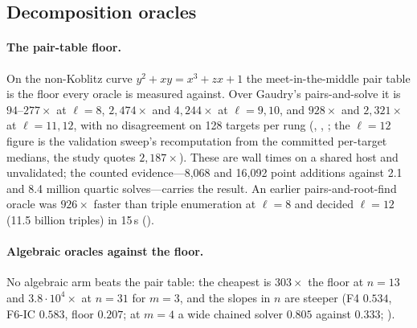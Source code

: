 \subsection{Decomposition oracles}

\paragraph{The pair-table floor.} On the non-Koblitz curve
$y^2+xy=x^3+zx+1$ the meet-in-the-middle pair table is the floor every
oracle is measured against. Over Gaudry's pairs-and-solve it is
$94$--$277\times$ at $\ell=8$, $2{,}474\times$ and $4{,}244\times$ at
$\ell=9,10$, and $928\times$ and $2{,}321\times$ at $\ell=11,12$, with no
disagreement on 128 targets per rung
(,
,
; the $\ell=12$ figure is
the validation sweep's recomputation from the committed per-target medians,
the study quotes $2{,}187\times$). These are wall times on a shared host and
unvalidated; the counted evidence---8{,}068 and 16{,}092 point additions
against 2.1 and 8.4 million quartic solves---carries the result. An earlier
pairs-and-root-find oracle was $926\times$ faster than triple enumeration at
$\ell=8$ and decided $\ell=12$ (11.5 billion triples) in 15\,s
().

\paragraph{Algebraic oracles against the floor.} No algebraic arm beats the
pair table: the cheapest is $303\times$ the floor at $n=13$ and
$3.8\cdot10^4\times$ at $n=31$ for $m=3$, and the slopes in $n$ are steeper
(F4 $0.534$, F6-IC $0.583$, floor $0.207$; at $m=4$ a wide chained solver
$0.805$ against $0.333$; ).

